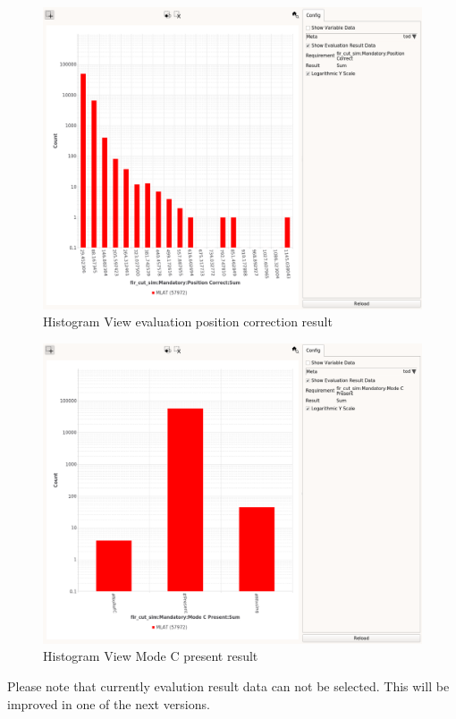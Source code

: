 \begin{figure}[H]
    \hspace*{-2cm}
    \includegraphics[width=18cm,frame]{figures/histogram_eval_pos_correct.png}
  \caption{Histogram View evaluation position correction result}
\end{figure}


\begin{figure}[H]
    \hspace*{-2cm}
    \includegraphics[width=18cm,frame]{figures/histogram_eval_mc.png}
  \caption{Histogram View Mode C present result}
\end{figure}

Please note that currently evalution result data can not be selected. This will be improved in one of the next versions.

